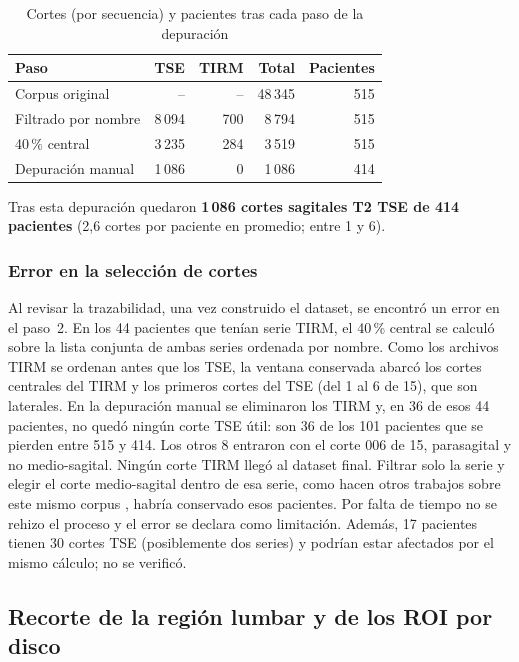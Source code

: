 \begin{table}[!htb]
\centering\footnotesize
\caption{Cortes (por secuencia) y pacientes tras cada paso de la depuración}
\label{tab:etapas}
\begin{tabular}{lrrrr}
\toprule
Paso & TSE & TIRM & Total & Pacientes \\
\midrule
Corpus original & -- & -- & 48\,345 & 515 \\
Filtrado por nombre & 8\,094 & 700 & 8\,794 & 515 \\
40\,\% central & 3\,235 & 284 & 3\,519 & 515 \\
Depuración manual & 1\,086 & 0 & 1\,086 & 414 \\
\bottomrule
\end{tabular}
\end{table}

Tras esta depuración quedaron \textbf{1\,086 cortes sagitales T2 TSE de 414 pacientes} (2,6 cortes por paciente en promedio; entre 1 y 6).

\subsubsection{Error en la selección de cortes}
Al revisar la trazabilidad, una vez construido el dataset, se encontró un error en el paso~2. En los 44 pacientes que tenían serie TIRM, el 40\,\% central se calculó sobre la lista conjunta de ambas series ordenada por nombre. Como los archivos TIRM se ordenan antes que los TSE, la ventana conservada abarcó los cortes centrales del TIRM y los primeros cortes del TSE (del 1 al 6 de 15), que son laterales. En la depuración manual se eliminaron los TIRM y, en 36 de esos 44 pacientes, no quedó ningún corte TSE útil: son 36 de los 101 pacientes que se pierden entre 515 y 414. Los otros 8 entraron con el corte 006 de 15, parasagital y no medio-sagital. Ningún corte TIRM llegó al dataset final. Filtrar solo la serie  y elegir el corte medio-sagital dentro de esa serie, como hacen otros trabajos sobre este mismo corpus \cite{natalia2024}, habría conservado esos pacientes. Por falta de tiempo no se rehizo el proceso y el error se declara como limitación. Además, 17 pacientes tienen 30 cortes TSE (posiblemente dos series) y podrían estar afectados por el mismo cálculo; no se verificó.

\subsection{Recorte de la región lumbar y de los ROI por disco}
\label{sec:roi}
